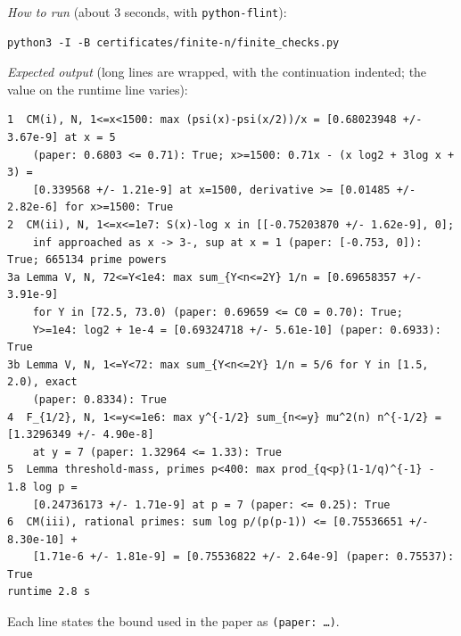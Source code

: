\emph{How to run} (about 3 seconds, with \texttt{python-flint}):
\begingroup\footnotesize
\begin{verbatim}
python3 -I -B certificates/finite-n/finite_checks.py
\end{verbatim}
\endgroup
\emph{Expected output} (long lines are wrapped, with the continuation indented; the value on the runtime line varies):
\begingroup\footnotesize
\begin{verbatim}
1  CM(i), N, 1<=x<1500: max (psi(x)-psi(x/2))/x = [0.68023948 +/- 3.67e-9] at x = 5
    (paper: 0.6803 <= 0.71): True; x>=1500: 0.71x - (x log2 + 3log x + 3) =
    [0.339568 +/- 1.21e-9] at x=1500, derivative >= [0.01485 +/- 2.82e-6] for x>=1500: True
2  CM(ii), N, 1<=x<=1e7: S(x)-log x in [[-0.75203870 +/- 1.62e-9], 0];
    inf approached as x -> 3-, sup at x = 1 (paper: [-0.753, 0]): True; 665134 prime powers
3a Lemma V, N, 72<=Y<1e4: max sum_{Y<n<=2Y} 1/n = [0.69658357 +/- 3.91e-9]
    for Y in [72.5, 73.0) (paper: 0.69659 <= C0 = 0.70): True;
    Y>=1e4: log2 + 1e-4 = [0.69324718 +/- 5.61e-10] (paper: 0.6933): True
3b Lemma V, N, 1<=Y<72: max sum_{Y<n<=2Y} 1/n = 5/6 for Y in [1.5, 2.0), exact
    (paper: 0.8334): True
4  F_{1/2}, N, 1<=y<=1e6: max y^{-1/2} sum_{n<=y} mu^2(n) n^{-1/2} = [1.3296349 +/- 4.90e-8]
    at y = 7 (paper: 1.32964 <= 1.33): True
5  Lemma threshold-mass, primes p<400: max prod_{q<p}(1-1/q)^{-1} - 1.8 log p =
    [0.24736173 +/- 1.71e-9] at p = 7 (paper: <= 0.25): True
6  CM(iii), rational primes: sum log p/(p(p-1)) <= [0.75536651 +/- 8.30e-10] +
    [1.71e-6 +/- 1.81e-9] = [0.75536822 +/- 2.64e-9] (paper: 0.75537): True
runtime 2.8 s
\end{verbatim}
\endgroup
Each line states the bound used in the paper as \texttt{(paper: \dots)}.

